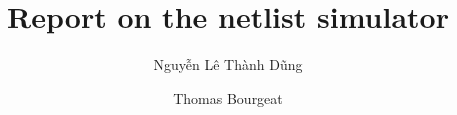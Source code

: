 \documentclass[a4paper, 11pt]{article}
\begin{document}
\title{Report on the netlist simulator}
\author{Nguyễn Lê Thành Dũng \and Thomas Bourgeat}
\maketitle
\end{document}
